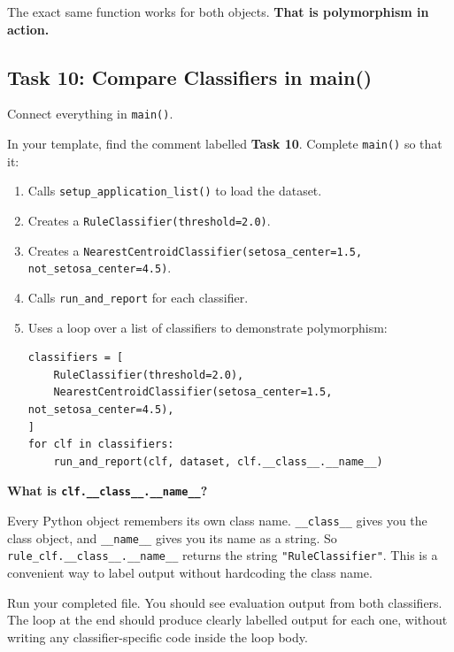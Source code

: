 \noindent
The exact same function works for both objects.
\textbf{That is polymorphism in action.}

\subsection{Task 10: Compare Classifiers in main()}

\begin{tcolorbox}[title=Task 10: Compare Classifiers in main()]
Connect everything in \texttt{main()}.

\medskip
\noindent
In your template, find the comment labelled \textbf{Task 10}.
Complete \texttt{main()} so that it:
\begin{enumerate}
    \item Calls \texttt{setup\_application\_list()} to load the dataset.
    \item Creates a \texttt{RuleClassifier(threshold=2.0)}.
    \item Creates a \texttt{NearestCentroidClassifier(setosa\_center=1.5, not\_setosa\_center=4.5)}.
    \item Calls \texttt{run\_and\_report} for each classifier.
    \item Uses a loop over a list of classifiers to demonstrate polymorphism:
\begin{verbatim}
classifiers = [
    RuleClassifier(threshold=2.0),
    NearestCentroidClassifier(setosa_center=1.5, not_setosa_center=4.5),
]
for clf in classifiers:
    run_and_report(clf, dataset, clf.__class__.__name__)
\end{verbatim}
\end{enumerate}
\end{tcolorbox}

\noindent
\textbf{What is \texttt{clf.\_\_class\_\_.\_\_name\_\_}?}

\medskip
\noindent
Every Python object remembers its own class name.
\texttt{\_\_class\_\_} gives you the class object, and \texttt{\_\_name\_\_} gives you its name as a string.
So \texttt{rule\_clf.\_\_class\_\_.\_\_name\_\_} returns the string \texttt{"RuleClassifier"}.
This is a convenient way to label output without hardcoding the class name.

\begin{tcolorbox}[title=Checkpoint]
Run your completed file.
You should see evaluation output from both classifiers.
The loop at the end should produce clearly labelled output for each one, without writing any classifier-specific code inside the loop body.
\end{tcolorbox}

